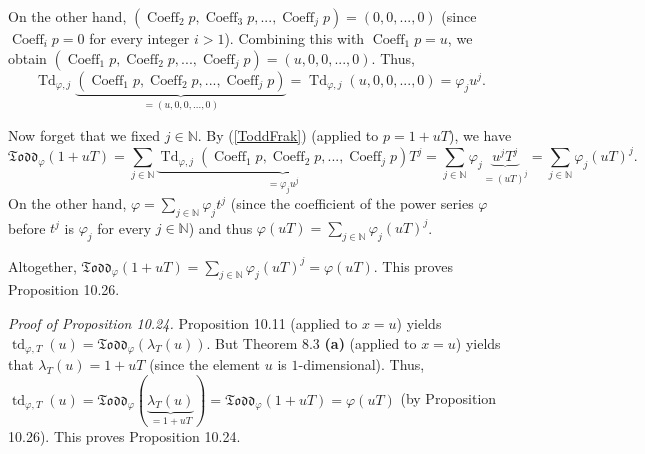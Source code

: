 \documentclass[numbers=enddot,12pt,final,onecolumn,notitlepage]{scrartcl}%
\begin{document}
On the other hand, $\left(  \operatorname*{Coeff}\nolimits_{2}%
p,\operatorname*{Coeff}\nolimits_{3}p,...,\operatorname*{Coeff}\nolimits_{j}%
p\right)  =\left(  0,0,...,0\right)  $ (since $\operatorname*{Coeff}%
\nolimits_{i}p=0$ for every integer $i>1$). Combining this with
$\operatorname*{Coeff}\nolimits_{1}p=u$, we obtain $\left(
\operatorname*{Coeff}\nolimits_{1}p,\operatorname*{Coeff}\nolimits_{2}%
p,...,\operatorname*{Coeff}\nolimits_{j}p\right)  =\left(  u,0,0,...,0\right)
$. Thus,%
\[
\operatorname*{Td}\nolimits_{\varphi,j}\underbrace{\left(
\operatorname*{Coeff}\nolimits_{1}p,\operatorname*{Coeff}\nolimits_{2}%
p,...,\operatorname*{Coeff}\nolimits_{j}p\right)  }_{=\left(
u,0,0,...,0\right)  }=\operatorname*{Td}\nolimits_{\varphi,j}\left(
u,0,0,...,0\right)  =\varphi_{j}u^{j}.
\]


Now forget that we fixed $j\in\mathbb{N}$. By (\ref{ToddFrak}) (applied to
$p=1+uT$), we have%
\[
\mathfrak{Todd}_{\varphi}\left(  1+uT\right)  =\sum\limits_{j\in\mathbb{N}%
}\underbrace{\operatorname*{Td}\nolimits_{\varphi,j}\left(
\operatorname*{Coeff}\nolimits_{1}p,\operatorname*{Coeff}\nolimits_{2}%
p,...,\operatorname*{Coeff}\nolimits_{j}p\right)  }_{=\varphi_{j}u^{j}}%
T^{j}=\sum\limits_{j\in\mathbb{N}}\varphi_{j}\underbrace{u^{j}T^{j}}_{=\left(
uT\right)  ^{j}}=\sum\limits_{j\in\mathbb{N}}\varphi_{j}\left(  uT\right)
^{j}.
\]
On the other hand, $\varphi=\sum\limits_{j\in\mathbb{N}}\varphi_{j}t^{j}$
(since the coefficient of the power series $\varphi$ before $t^{j}$ is
$\varphi_{j}$ for every $j\in\mathbb{N}$) and thus $\varphi\left(  uT\right)
=\sum\limits_{j\in\mathbb{N}}\varphi_{j}\left(  uT\right)  ^{j}$.

Altogether, $\mathfrak{Todd}_{\varphi}\left(  1+uT\right)  =\sum
\limits_{j\in\mathbb{N}}\varphi_{j}\left(  uT\right)  ^{j}=\varphi\left(
uT\right)  $. This proves Proposition 10.26.

\textit{Proof of Proposition 10.24.} Proposition 10.11 (applied to $x=u$)
yields $\operatorname*{td}\nolimits_{\varphi,T}\left(  u\right)
=\mathfrak{Todd}_{\varphi}\left(  \lambda_{T}\left(  u\right)  \right)  $. But
Theorem 8.3 \textbf{(a)} (applied to $x=u$) yields that $\lambda_{T}\left(
u\right)  =1+uT$ (since the element $u$ is $1$-dimensional). Thus,
$\operatorname*{td}\nolimits_{\varphi,T}\left(  u\right)  =\mathfrak{Todd}%
_{\varphi}\left(  \underbrace{\lambda_{T}\left(  u\right)  }_{=1+uT}\right)
=\mathfrak{Todd}_{\varphi}\left(  1+uT\right)  =\varphi\left(  uT\right)  $
(by Proposition 10.26). This proves Proposition 10.24.
\end{document}
